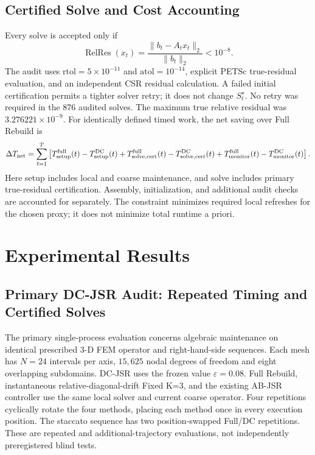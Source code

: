 \documentclass[preprint,12pt,3p]{elsarticle}
\begin{document}
\subsection{Certified Solve and Cost Accounting}
Every solve is accepted only if
\begin{equation}
\operatorname{RelRes}(x_t)=\frac{\|b_t-A_t x_t\|_2}{\|b_t\|_2}<10^{-8}.
\label{eq:rel_res}
\end{equation}
The audit uses $\mathrm{rtol}=5\times10^{-11}$ and
$\mathrm{atol}=10^{-14}$, explicit PETSc true-residual evaluation, and an
independent CSR residual calculation. A failed initial certification permits
a tighter solver retry; it does not change $S_t^\star$. No retry was required
in the 876 audited solves. The maximum true relative residual was
$3.276221\times10^{-9}$.
For identically defined timed work, the net saving over Full Rebuild is
\begin{equation}
\Delta T_{\rm net}=\sum_{t=1}^T
\left[T_{\rm setup}^{\rm full}(t)-T_{\rm setup}^{\rm DC}(t)
      +T_{\rm solve,cert}^{\rm full}(t)-T_{\rm solve,cert}^{\rm DC}(t)
      +T_{\rm monitor}^{\rm full}(t)-T_{\rm monitor}^{\rm DC}(t)\right].
\label{eq:cost_model}
\end{equation}
Here setup includes local and coarse maintenance, and solve includes primary
true-residual certification. Assembly, initialization, and additional audit
checks are accounted for separately. The constraint minimizes required local
refreshes for the chosen proxy; it does not minimize total runtime a priori.

\section{Experimental Results}
\label{sec:results}

\subsection{Primary DC-JSR Audit: Repeated Timing and Certified Solves}
\label{subsec:dc_primary_audit}
The primary single-process evaluation concerns algebraic maintenance on identical prescribed
3-D FEM operator and right-hand-side sequences. Each mesh has $N=24$ intervals
per axis, $15,625$ nodal degrees of freedom and eight overlapping subdomains.
DC-JSR uses the frozen value $\varepsilon=0.08$. Full Rebuild, instantaneous
relative-diagonal-drift Fixed K=3, and the existing AB-JSR controller use the
same local solver and current coarse operator. Four repetitions cyclically
rotate the four methods, placing each method once in every execution position.
The staccato sequence has two position-swapped Full/DC repetitions.
These are repeated and additional-trajectory evaluations, not independently
preregistered blind tests.
\end{document}
